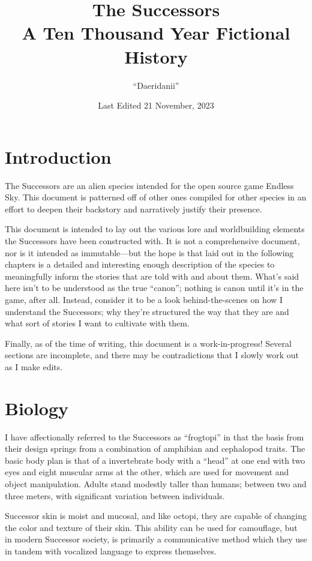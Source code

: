 \documentclass[11pt]{report}
\title{%
    The Successors \\ 
    \smallskip
    \large A Ten Thousand Year Fictional History}
\author{``Daeridanii''}
\date{Last Edited 21 November, 2023}
\begin{document}
    \maketitle
    \tableofcontents
    \newpage
    \section{Introduction}
    The Successors are an alien species intended for the open source game Endless Sky. This document is patterned off of other ones compiled for other species in an effort to deepen their backstory and narratively justify their presence.
    
    This document is intended to lay out the various lore and worldbuilding elements the Successors have been constructed with. It is not a comprehensive document, nor is it intended as immutable---but the hope is that laid out in the following chapters is a detailed and interesting enough description of the species to meaningfully inform the stories that are told with and about them. What's said here isn't to be understood as the true ``canon''; nothing is canon until it's in the game, after all. Instead, consider it to be a look behind-the-scenes on how I understand the Successors; why they're structured the way that they are and what sort of stories I want to cultivate with them.

    Finally, as of the time of writing, this document is a work-in-progress! Several sections are incomplete, and there may be contradictions that I slowly work out as I make edits.

    \section{Biology}
    I have affectionally referred to the Successors as ``frogtopi'' in that the basis from their design springs from a combination of amphibian and cephalopod traits. The basic body plan is that of a invertebrate body with a ``head'' at one end with two eyes and eight muscular arms at the other, which are used for movement and object manipulation. Adults stand modestly taller than humans; between two and three meters, with significant variation between individuals. 

    Successor skin is moist and mucosal, and like octopi, they are capable of changing the color and texture of their skin. This ability can be used for camouflage, but in modern Successor society, is primarily a communicative method which they use in tandem with vocalized language to express themselves.
    
\end{document}
